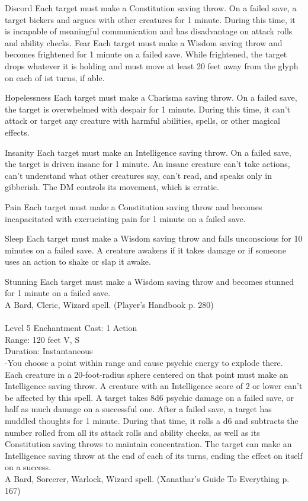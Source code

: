 \documentclass[10pt,twocolumn]{report}
\begin{document}
Discord
Each target must make a Constitution saving throw. On a failed save, a target bickers and argues with other creatures for 1 minute. During this time, it is incapable of meaningful communication and has disadvantage on attack rolls and ability checks.
Fear
Each target must make a Wisdom saving throw and becomes frightened for 1 minute on a failed save. While frightened, the target drops whatever it is holding and must move at least 20 feet away from the glyph on each of ist turns, if able. 

Hopelessness
Each target must make a Charisma saving throw. On a failed save, the target is overwhelmed with despair for 1 minute. During this time, it can't attack or target any creature with harmful abilities, spells, or other magical effects.

Insanity
Each target must make an Intelligence saving throw. On a failed save, the target is driven insane for 1 minute. An insane creature can't take actions, can't understand what other creatures say, can't read, and speaks only in gibberish. The DM controls its movement, which is erratic.

Pain
Each target must make a Constitution saving throw and becomes incapacitated with excruciating pain for 1 minute on a failed save.

Sleep
Each target must make a Wisdom saving throw and falls unconscious for 10 minutes on a failed save. A creature awakens if it takes damage or if someone uses an action to shake or slap it awake.

Stunning
Each target must make a Wisdom saving throw and becomes stunned for 1 minute on a failed save.\\
A Bard, Cleric, Wizard spell. (Player's Handbook p. 280) \\


 \\
Level 5 \quad Enchantment \quad Cast: 1 Action\\
Range: 120 feet \quad V, S\\
Duration: Instantaneous \quad \\
-You choose a point within range and cause psychic energy to explode there. Each creature in a 20-foot-radius sphere centered on that point must make an Intelligence saving throw. A creature with an Intelligence score of 2 or lower can’t be affected by this spell. A target takes 8d6 psychic damage on a failed save, or half as much damage on a successful one.
After a failed save, a target has muddled thoughts for 1 minute. During that time, it rolls a d6 and subtracts the number rolled from all its attack rolls and ability checks, as well as its Constitution saving throws to maintain concentration. The target can make an Intelligence saving throw at the end of each of its turns, ending the effect on itself on a success.\\
A Bard, Sorcerer, Warlock, Wizard spell. (Xanathar's Guide To Everything p. 167) \\
\end{document}
